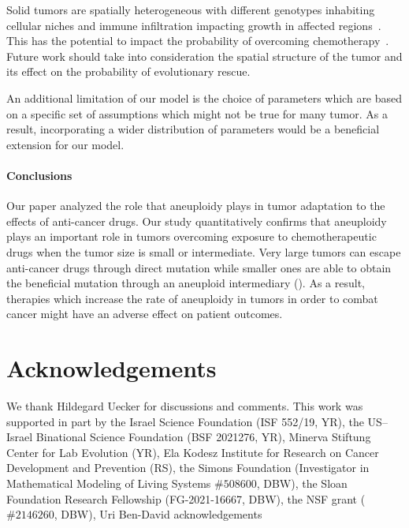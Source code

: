 \documentclass[12pt]{extarticle}
\begin{document}
Solid tumors are spatially heterogeneous with different genotypes inhabiting cellular niches and immune infiltration impacting growth in affected regions~\citep{varrone2023cellcharter,galon2010immune}. This has the potential to impact the probability of overcoming chemotherapy~\citep{martens2011spatial}. Future work should take into consideration the spatial structure of the tumor and its effect on the probability of evolutionary rescue.

An additional limitation of our model is the choice of parameters which are based on a specific set of assumptions which might not be true for many tumor. As a result, incorporating a wider distribution of parameters would be a beneficial extension for our model.
\paragraph{Conclusions}

Our paper analyzed the role that aneuploidy plays in tumor adaptation to the effects of anti-cancer drugs. Our study quantitatively confirms that aneuploidy plays an important role in tumors overcoming exposure to chemotherapeutic drugs when the tumor size is small or intermediate. Very large tumors can escape anti-cancer drugs through direct mutation while smaller ones are able to obtain the beneficial mutation through an aneuploid intermediary (). As a result, therapies which increase the rate of aneuploidy in tumors in order to combat cancer might have an adverse effect on patient outcomes.



{\small
\section*{Acknowledgements}
We thank Hildegard Uecker for discussions and comments. 
This work was supported in part by
the Israel Science Foundation (ISF 552/19, YR),
the US–Israel Binational Science Foundation (BSF 2021276, YR), 
Minerva Stiftung Center for Lab Evolution (YR), 
Ela Kodesz Institute for Research on Cancer Development and Prevention (RS),
the Simons Foundation (Investigator in Mathematical Modeling of Living Systems $\#508600$, DBW),
the Sloan Foundation Research Fellowship (FG-2021-16667, DBW),
the NSF grant ($\#2146260$, DBW),
{\color{red} Uri Ben-David acknowledgements}


}
\end{document}
